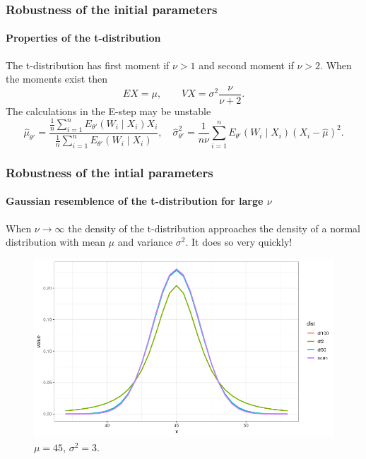 \documentclass[aspectratio=169]{beamer}
\begin{document}
\begin{frame}
    \frametitle{Robustness of the initial parameters}
    \framesubtitle{Properties of the t-distribution}
    The t-distribution has first moment if $\nu > 1$ and second moment if $\nu > 2$. When the moments exist then
    \begin{equation}
        EX = \mu,\quad\quad VX = \sigma^{2}\frac{\nu}{\nu + 2}.
    \end{equation}
    The calculations in the E-step may be unstable
    \begin{equation*}
        \hat\mu_{\theta'} =\frac{\frac{1}{n}\sum_{i=1}^{n}E_{\theta'}(W_{i}\mid X_{i})X_{i}}{\frac{1}{n}\sum_{i=1}^{n}E_{\theta'}(W_{i}\mid X_{i})},\quad \hat\sigma^{2}_{\theta'}= \frac{1}{n\nu}\sum_{i=1}^{n}E_{\theta'}(W_{i}\mid X_{i})(X_{i}-\hat\mu)^{2}.
    \end{equation*}
\end{frame}

\begin{frame}[fragile]
    \frametitle{Robustness of the intial parameters}
    \framesubtitle{Gaussian resemblence of the t-distribution for large $\nu$}
    When $\nu\longrightarrow\infty$ the density of the t-distribution approaches the density of a normal distribution with mean $\mu$ and variance $\sigma^{2}$. It does so very quickly!
    \begin{figure}
        \centering
        \includegraphics[scale=0.35]{pictures/densities.png}
        \caption{$\mu = 45$, $\sigma^{2}= 3$.}
    \end{figure}
\end{frame}
\end{document}
